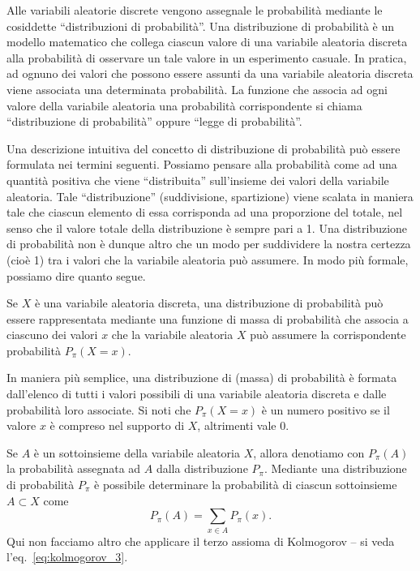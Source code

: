 Alle variabili aleatorie discrete vengono assegnale le probabilità mediante le cosiddette \enquote{distribuzioni di probabilità}. 
Una distribuzione di probabilità è un modello matematico che collega ciascun valore di una variabile aleatoria discreta alla probabilità di osservare un tale valore in un esperimento casuale.
In pratica, ad ognuno dei valori che possono essere assunti da una variabile aleatoria discreta viene associata una determinata probabilità. 
La funzione che associa ad ogni valore della variabile aleatoria una probabilità corrispondente si chiama \enquote{distribuzione di probabilità} oppure \enquote{legge di probabilità}.

Una descrizione intuitiva del concetto di distribuzione di probabilità può essere formulata nei  termini seguenti.
Possiamo pensare alla probabilità come ad una quantità positiva che viene \enquote{distribuita} sull'insieme dei valori della variabile aleatoria. 
Tale \enquote{distribuzione} (suddivisione, spartizione) viene scalata in maniera tale che ciascun elemento di essa corrisponda ad una proporzione del totale, nel senso che il valore totale della distribuzione è sempre pari a 1.  
Una distribuzione di probabilità non è dunque altro che un modo per suddividere la nostra certezza (cioè 1) tra i valori che la variabile aleatoria può assumere.
In modo più formale, possiamo dire quanto segue.
\begin{defn}
Se $X$ è una variabile aleatoria discreta, una distribuzione di probabilità può essere rappresentata mediante una funzione di massa di probabilità che associa a ciascuno dei valori $x$ che la variabile aleatoria $X$ può assumere la corrispondente probabilità $P_{\pi}(X=x)$. 
\end{defn}
In maniera più semplice, una distribuzione di (massa) di probabilità è formata dall'elenco di tutti i valori possibili di una variabile aleatoria discreta e dalle probabilità loro associate.
Si noti che $P_{\pi}(X=x)$ è un numero positivo se il valore $x$ è compreso nel supporto di $X$, altrimenti vale 0.

Se $A$ è un sottoinsieme della variabile aleatoria $X$, allora denotiamo con $P_{\pi}(A)$ la probabilità assegnata ad $A$ dalla distribuzione $P_{\pi}$.
Mediante una distribuzione di probabilità $P_{\pi}$ è possibile determinare la probabilità di ciascun sottoinsieme $A \subset X$ come
\begin{equation}
P_{\pi}(A) = \sum_{x \in A} P_{\pi}(x).
\end{equation}
Qui non facciamo altro che applicare il terzo assioma di Kolmogorov -- si veda l'eq.~\eqref{eq:kolmogorov_3}.


